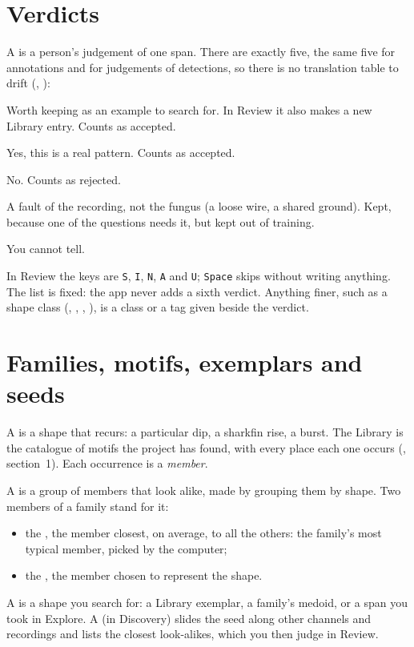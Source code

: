 \section{Verdicts}\label{sec:core-ideas-verdicts}
A  is a person's judgement of one span. There are exactly five, the
same five for annotations and for judgements of detections, so there is no translation
table to drift (, ):
\begin{description}[style=nextline, leftmargin=1.6em, font=\sffamily\bfseries]
\item[seed] Worth keeping as an example to search for. In Review it also makes a new
  Library entry. Counts as accepted.
\item[interesting] Yes, this is a real pattern. Counts as accepted.
\item[not interesting] No. Counts as rejected.
\item[artifact] A fault of the recording, not the fungus (a loose wire, a shared ground).
  Kept, because one of the questions needs it, but kept out of training.
\item[unsure] You cannot tell.
\end{description}
In Review the keys are \texttt{S}, \texttt{I}, \texttt{N}, \texttt{A} and \texttt{U};
\texttt{Space} skips without writing anything. The list is fixed: the app never adds a sixth
verdict. Anything finer, such as a shape class (, ,
, ), is a class or a tag given beside the verdict.

\section{Families, motifs, exemplars and seeds}\label{sec:core-ideas-families}
A  is a shape that recurs: a particular dip, a sharkfin rise, a burst.
The Library is the catalogue of motifs the project has found, with every place each one
occurs (, section~1). Each occurrence is a \emph{member}.

A  is a group of members that look alike, made by grouping them by
shape. Two members of a family stand for it:
\begin{itemize}
  \item the , the member closest, on average, to all the others: the
    family's most typical member, picked by the computer;
  \item the , the member chosen to represent the shape.
\end{itemize}
A  is a shape you search for: a Library exemplar, a family's medoid, or a
span you took in Explore. A  (in Discovery) slides the seed
along other channels and recordings and lists the closest look-alikes, which you then judge
in Review.

